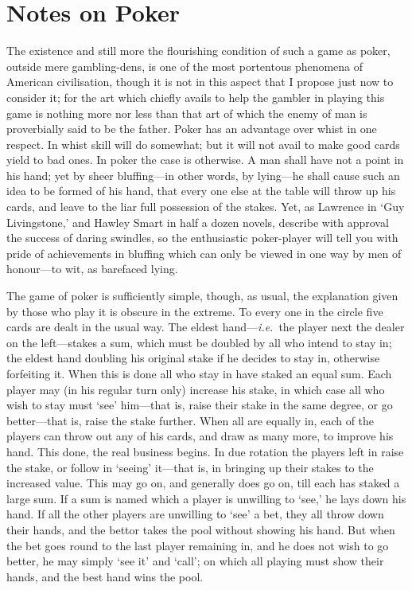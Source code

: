 \documentclass[letterpaper,12pt,oneside,openany]{memoir}
\begin{document}
\chapter{Notes on Poker}

The existence and still more the flourishing condition
of such a game as poker, outside mere gambling-dens,
is one of the most portentous phenomena of American
civilisation, though it is not in this aspect that I propose
just now to consider it; for the art which chiefly
avails to help the gambler in playing this game is
nothing more nor less than that art of which the enemy
of man is proverbially said to be the father. Poker has
an advantage over whist in one respect. In whist skill
will do somewhat; but it will not avail to make good
cards yield to bad ones. In poker the case is otherwise.
A man shall have not a point in his hand; yet by sheer
bluffing---in other words, by lying---he shall cause such
an idea to be formed of his hand, that every one else at
the table will throw up his cards, and leave to the liar
full possession of the stakes. Yet, as Lawrence in `Guy
Livingstone,' and Hawley Smart in half a dozen novels,
describe with approval the success of daring swindles,
so the enthusiastic poker-player will tell you with pride
of achievements in bluffing which can only be viewed
in one way by men of honour---to wit, as barefaced
lying.

The game of poker is sufficiently simple, though, as
usual, the explanation given by those who play it is
obscure in the extreme. To every one in the circle five
cards are dealt in the usual way. The eldest hand---\textit{i.e.}\ the
player next the dealer on the left---stakes a sum,
which must be doubled by all who intend to stay in;
the eldest hand doubling his original stake if he decides
to stay in, otherwise forfeiting it. When this is done
all who stay in have staked an equal sum. Each
player may (in his regular turn only) increase his
stake, in which case all who wish to stay must `see'
him---that is, raise their stake in the same degree, or go
better---that is, raise the stake further. When all are
equally in, each of the players can throw out any of his
cards, and draw as many more, to improve his hand.
This done, the real business begins. In due rotation
the players left in raise the stake, or follow in `seeing'
it---that is, in bringing up their stakes to the increased
value. This may go on, and generally does go on, till
each has staked a large sum. If a sum is named which
a player is unwilling to `see,' he lays down his hand.
If all the other players are unwilling to `see' a bet,
they all throw down their hands, and the bettor takes
the pool without showing his hand. But when the bet
goes round to the last player remaining in, and he does
not wish to go better, he may simply `see it' and
`call'; on which all playing must show their hands,
and the best hand wins the pool.
\end{document}
